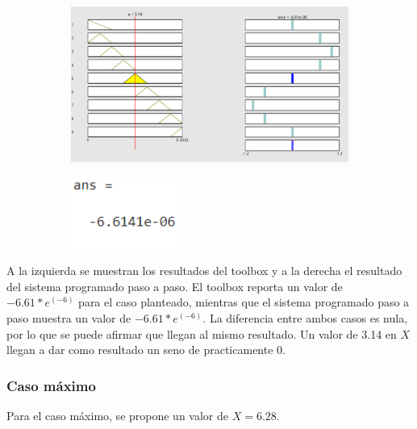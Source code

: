 \documentclass[11pt, letterpaper]{article}
\begin{document}
\begin{figure}[h]
	\centering
	\begin{subfigure}{0.40\textwidth} %
		\centering
		\includegraphics[width=1.4\textwidth]{IMG/RP12.png}
		\label{fig:G5}
	\end{subfigure}
	\hfill
	\begin{subfigure}{0.42\textwidth} %
		\centering
		\includegraphics[width=0.4\textwidth]{IMG/M12.png}
		\label{fig:G6}
	\end{subfigure}
	\label{fig:comparacion3}
\end{figure}

A la izquierda se muestran los resultados del toolbox y a la derecha el resultado del sistema programado paso a paso. El toolbox reporta un valor de $-6.61*e^(-6)$ para el caso planteado, mientras que el sistema programado paso a paso muestra un valor de $-6.61*e^(-6)$. La diferencia entre ambos casos es nula, por lo que se puede afirmar que llegan al mismo resultado. Un valor de 3.14 en $X$ llegan a dar como resultado un seno de practicamente 0.

\newpage

\subsubsection{Caso máximo}
Para el caso máximo, se propone un valor de $X = 6.28$.
\end{document}
